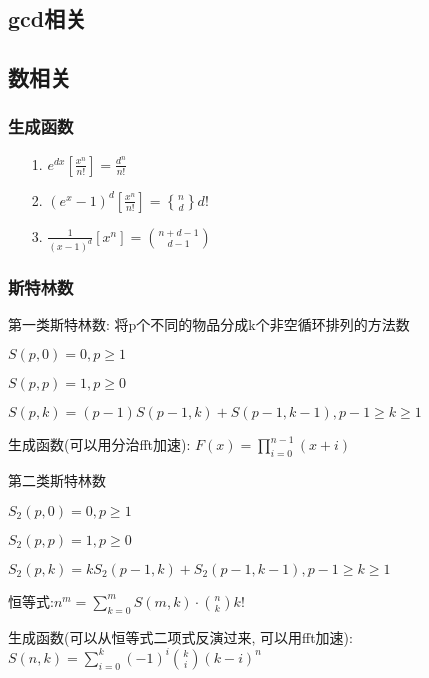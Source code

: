 \documentclass[UTF8]{article}
\newcommand{\cppcode}[1]{
    
}
\begin{document}
\subsection{gcd相关}
\cppcode{exgcd.cpp}

\subsection{数相关}
\subsubsection{生成函数}

\begin{enumerate}
	\item[1.] $e^{dx}[\frac{x^n}{n!}] = \frac{d^n}{n!}$
	\item[2.] $(e^x-1)^d[\frac{x^n}{n!}] = {n\brace d}d!$
	\item[3.] $\frac{1}{(x-1)^d}[x^n] = \binom{n+d-1}{d-1} $
\end{enumerate}

\subsubsection{斯特林数}
	
	第一类斯特林数: 将p个不同的物品分成k个非空循环排列的方法数
	
	$S(p, 0) = 0, p\geq 1$

	$S(p, p) = 1, p\geq 0$

	$S(p, k) = (p-1)S(p-1, k)+S(p-1, k-1), p-1\geq k\geq 1$

	生成函数(可以用分治fft加速): $F(x) = \prod _{i=0}^{n-1}(x+i)$

	第二类斯特林数

	$S_2(p, 0) = 0, p\geq 1$

	$S_2(p, p) = 1, p\geq 0$

	$S_2(p, k) = kS_2(p-1, k)+S_2(p-1, k-1), p-1\geq k\geq 1$

	恒等式:$n^m = \sum_{k=0}^m S(m,k)\cdot \binom{n}{k} k!$

	生成函数(可以从恒等式二项式反演过来, 可以用fft加速): $S(n, k) = \sum _{i=0}^k (-1)^i \binom{k}{i}(k-i)^n$
\end{document}
